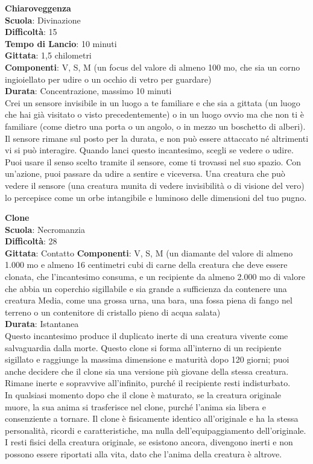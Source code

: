 \begin{multicols}{2}
\medskip\textbf{Chiaroveggenza}\\
\textbf{Scuola}: Divinazione\\
\textbf{Difficoltà}:  15\\
\textbf{Tempo di Lancio}: 10 minuti\\
\textbf{Gittata}: 1,5 chilometri\\
\textbf{Componenti}: V, S, M (un focus del valore di almeno 100 mo, che sia un corno ingioiellato per udire o un occhio di vetro per guardare)\\
\textbf{Durata}: Concentrazione, massimo 10 minuti\\
Crei un sensore invisibile in un luogo a te familiare e che sia a gittata (un luogo che hai già visitato o visto precedentemente) o in un luogo ovvio ma che non ti è familiare (come dietro una porta o un angolo, o in mezzo un boschetto di alberi). Il sensore rimane sul posto per la durata, e non può essere attaccato né altrimenti vi si può interagire. Quando lanci questo incantesimo, scegli se vedere o udire. Puoi usare il senso scelto tramite il sensore, come ti trovassi nel suo spazio. Con un'azione, puoi passare da udire a sentire e viceversa. Una creatura che può vedere il sensore (una creatura munita di vedere invisibilità o di visione del vero) lo percepisce come un orbe intangibile e luminoso delle dimensioni del tuo pugno.

\medskip\textbf{Clone}\\
\textbf{Scuola}: Necromanzia\\
\textbf{Difficoltà}:  28\\
\textbf{Gittata}: Contatto
\textbf{Componenti}: V, S, M (un diamante del valore di almeno 1.000 mo e almeno 16 centimetri cubi di carne della creatura che deve essere clonata, che l'incantesimo consuma, e un recipiente da almeno 2.000 mo di valore che abbia un coperchio sigillabile e sia grande a sufficienza da contenere una creatura Media, come una grossa urna, una bara, una fossa piena di fango nel terreno o un contenitore di cristallo pieno di acqua salata)\\
\textbf{Durata}: Istantanea\\
Questo incantesimo produce il duplicato inerte di una creatura vivente come salvaguardia dalla morte. Questo clone si forma all'interno di un recipiente sigillato e raggiunge la massima dimensione e maturità dopo 120 giorni; puoi anche decidere che il clone sia una versione più giovane della stessa creatura. Rimane inerte e sopravvive all'infinito, purché il recipiente resti indisturbato.\\
In qualsiasi momento dopo che il clone è maturato, se la creatura originale muore, la sua anima si trasferisce nel clone, purché l’anima sia libera e consenziente a tornare. Il clone è fisicamente identico all'originale e ha la stessa personalità, ricordi e caratteristiche, ma nulla dell'equipaggiamento dell'originale. I resti fisici della creatura originale, se esistono ancora, divengono inerti e non possono essere riportati alla vita, dato che l’anima della creatura è altrove. 


\end{multicols}
